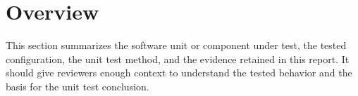 \section{Overview}
This section summarizes the software unit or component under test, the tested
configuration, the unit test method, and the evidence retained in this report.
It should give reviewers enough context to understand the tested behavior and
the basis for the unit test conclusion.
